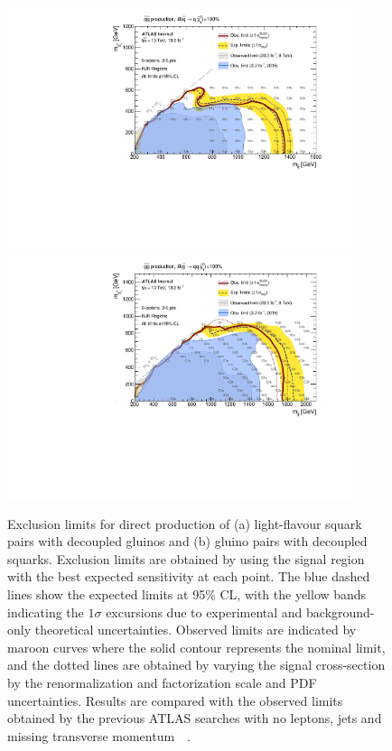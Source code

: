 \begin{figure}[tbph]
\begin{center}
\includegraphics[width=0.9\textwidth]{figures/ATLAS-CONF-2016-078_INT/Sensitivity/RJR/atlasCLs_SS_direct_showSR}
\includegraphics[width=0.9\textwidth]{figures/ATLAS-CONF-2016-078_INT/Sensitivity/RJR/atlasCLs_GG_direct_showSR}
\end{center}
\caption{Exclusion limits for direct production of (a) light-flavour squark pairs with decoupled gluinos and (b) gluino pairs with decoupled squarks.
Exclusion limits are obtained by using the signal region with the best expected sensitivity at each point.
The blue dashed lines show the expected limits at 95\% CL, with the yellow bands indicating the $1\sigma$ excursions due to experimental and background-only  theoretical uncertainties.
Observed limits are indicated by maroon curves where the solid contour represents the nominal limit, and the dotted lines are obtained by varying the signal cross-section by the renormalization and factorization scale and PDF uncertainties.
Results are compared with the observed limits obtained by the previous ATLAS searches with no leptons, jets and missing transverse momentum~~\cite{SUSY-2015-06,SUSY-2013-02}.}
\label{fig:sensitivitytext}
\end{figure}